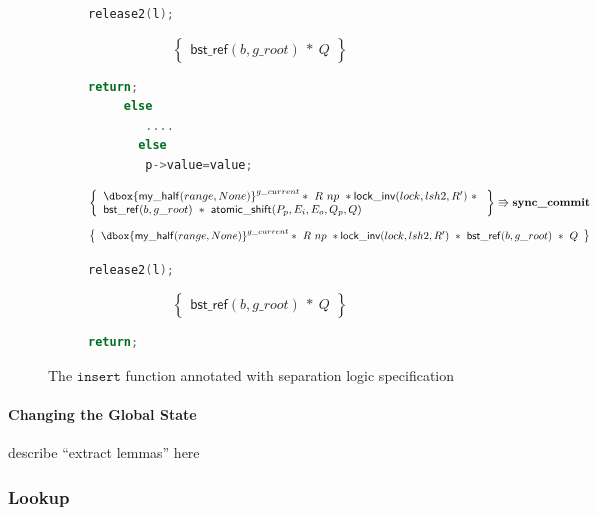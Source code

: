 \documentclass[acmsmall,screen]{acmart}\settopmatter{printfolios=true}
\newcommand\dboxed[1]{\dbox{\ensuremath{#1}}}
\newcommand{\ghost}[2]{\ensuremath{\dboxed{#1}^{#2}}}
\newcommand{\nodeboxrep}{\ensuremath{\mathsf{bst\_ref}}}
\begin{document}
\begin{figure}[htp]
\begin{subfigure}[t]{1\textwidth}
 \vspace*{-10pt}
        \begin{lstlisting}[language = C,numbers = none]
      release2(l);
         \end{lstlisting}
       $$\left\{\begin{array}{l} \nodeboxrep(b,g\_root)\ *\ Q\end{array}\right\}$$
        \vspace*{-10pt}
         \begin{lstlisting}[language = C,numbers = none]
      return;
     else 
        ....
       else 
      	p->value=value;
      	\end{lstlisting} 
$$\left\{\begin{array}{l} \ghost{\mathsf{my\_half}(range,None)}{g\_current}*\ R\ np\ *
\mathsf{lock\_inv}(lock,lsh2,R')\ *\ \\\nodeboxrep(b,g\_root)\ *\ \mathsf{atomic\_shift}(P_p,E_i,E_o,Q_p,Q)\end{array}\right\} \Rrightarrow{\textbf{sync\_commit}}$$
$$\left\{\begin{array}{l} \ghost{\mathsf{my\_half}(range,None)}{g\_current}*\ R\ np\ *\mathsf{lock\_inv}(lock,lsh2,R')\ *\ \nodeboxrep(b,g\_root)\ *\ Q\end{array}\right\}$$
         \vspace*{-10pt}
      	\begin{lstlisting}[language = C, numbers = none]
        release2(l);
        \end{lstlisting}
        $$\left\{\begin{array}{l}  \nodeboxrep(b,g\_root)\ *\ Q\end{array}\right\}$$
         \vspace*{-10pt}
        \begin{lstlisting}[language = C, numbers = none] 
      	return;
\end{lstlisting}
\end{subfigure}
\caption{The $\texttt{insert}$ function annotated with separation logic specification}
\label{insertproof}
\end{figure} 

\paragraph{Changing the Global State} describe ``extract lemmas'' here

\subsubsection{Lookup}
\end{document}
